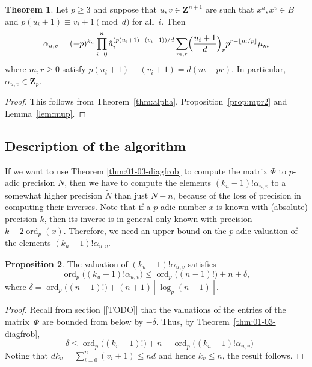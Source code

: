 \documentclass[a4paper,11pt]{article}
\numberwithin{equation}{section}
\providecommand{\floor}[1]{\left\lfloor#1\right\rfloor}   %
\newcommand{\ZZ}{\mathbf{Z}} %
\DeclareMathOperator{\ord}{ord}          %
\theoremstyle{definition}
\newtheorem{thm}{Theorem}[section]
\newtheorem{prop}[thm]{Proposition}
\begin{document}
\begin{thm} \label{thm:alphap}
Let $p \geq 3$ and suppose that $u, v \in \ZZ^{n+1}$ are such 
that $x^u, x^v \in B$ and 
$p (u_i + 1) \equiv v_i + 1 \pmod{d}$ for all~$i$. Then 
\begin{equation} \label{eq:alphap.0}
\alpha_{u,v} = (-p)^{k_u} \prod_{i=0}^n 
    \hat{a}_i^{(p (u_i + 1) - (v_i + 1))/d} \sum_{m,r} 
    \Bigl(\frac{u_i+1}{d}\Bigr)_r p^{r - \floor{m/p}} \mu_m
\end{equation}
where $m, r \geq 0$ satisfy $p (u_i + 1) - (v_i + 1) = d (m - pr)$. 
In particular, $\alpha_{u, v} \in \ZZ_p$. 
\end{thm}

\begin{proof}
This follows from Theorem~\ref{thm:alpha}, Proposition~\ref{prop:mpr2} 
and Lemma~\ref{lem:mup}.
\end{proof}

\subsection{Description of the algorithm}

If we want to use Theorem \ref{thm:01-03-diagfrob} to compute the matrix 
$\Phi$ to $p$-adic precision $N$, then we have to compute the elements
$(k_u-1)!\alpha_{u,v}$ to a somewhat higher precision $\tilde{N}$ than just
$N-n$, because 
of the loss of precision in computing their inverses. Note that if a $p$-adic 
number $x$ is known with (absolute) precision $k$, then its inverse is in general 
only known with precision $k-2\ord_p(x)$. Therefore, we need an upper bound
on the $p$-adic valuation of the elements $(k_u-1)!\alpha_{u,v}$.

\begin{prop}
The valuation of $(k_u-1)! \alpha_{u,v}$ satisfies
\begin{equation}
\ord_p\bigl((k_u-1)! \alpha_{u,v}\bigr) 
    \leq \ord_p\bigl((n-1)!\bigr) + n + \delta,
\end{equation}
where $\delta = \ord_p\bigl((n-1)!\bigr) + (n+1) \floor{\log_p(n-1)}$. 
\end{prop}

\begin{proof}
Recall from section [[TODO]] that the valuations 
of the entries of the matrix~$\Phi$ are bounded from below by $-\delta$. 
Thus, by Theorem~\ref{thm:01-03-diagfrob}, 
\begin{equation}
-\delta \leq \ord_p\bigl((k_v-1)!\bigr) + n 
           - \ord_p\bigl((k_u-1)! \alpha_{u,v}\bigr)
\end{equation}
Noting that $d k_v = \sum_{i=0}^n (v_i + 1) \leq n d$ and 
hence $k_v \leq n$, the result follows.
\end{proof}
\end{document}
